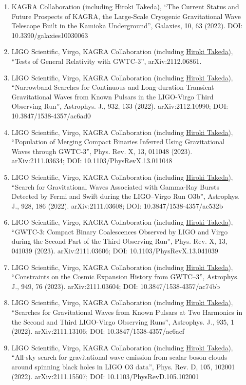 \documentclass[uplatex, 11pt]{jsarticle}
\begin{document}
\begin{enumerate}
\item KAGRA Collaboration (including \uline{Hiroki Takeda}), “The Current Status and Future Prospects of KAGRA, the Large-Scale Cryogenic Gravitational Wave Telescope Built in the Kamioka Underground”, Galaxies, 10, 63 (2022). DOI: 10.3390/galaxies10030063
\item LIGO Scientific, Virgo, KAGRA Collaboration (including \uline{Hiroki Takeda}), “Tests of General Relativity with GWTC-3”, arXiv:2112.06861.
\item LIGO Scientific, Virgo, KAGRA Collaboration (including \uline{Hiroki Takeda}), “Narrowband Searches for Continuous and Long-duration Transient Gravitational Waves from Known Pulsars in the LIGO-Virgo Third Observing Run”, Astrophys. J., 932, 133 (2022). arXiv:2112.10990; DOI: 10.3847/1538-4357/ac6ad0
\item LIGO Scientific, Virgo, KAGRA Collaboration (including \uline{Hiroki Takeda}), “Population of Merging Compact Binaries Inferred Using Gravitational Waves through GWTC-3”, Phys. Rev. X, 13, 011048 (2023). arXiv:2111.03634; DOI: 10.1103/PhysRevX.13.011048
\item LIGO Scientific, Virgo, KAGRA Collaboration (including \uline{Hiroki Takeda}), “Search for Gravitational Waves Associated with Gamma-Ray Bursts Detected by Fermi and Swift during the LIGO--Virgo Run O3b”, Astrophys. J., 928, 186 (2022). arXiv:2111.03608; DOI: 10.3847/1538-4357/ac532b
\item LIGO Scientific, Virgo, KAGRA Collaboration (including \uline{Hiroki Takeda}), “GWTC-3: Compact Binary Coalescences Observed by LIGO and Virgo during the Second Part of the Third Observing Run”, Phys. Rev. X, 13, 041039 (2023). arXiv:2111.03606; DOI: 10.1103/PhysRevX.13.041039
\item LIGO Scientific, Virgo, KAGRA Collaboration (including \uline{Hiroki Takeda}), “Constraints on the Cosmic Expansion History from GWTC--3”, Astrophys. J., 949, 76 (2023). arXiv:2111.03604; DOI: 10.3847/1538-4357/ac74bb
\item LIGO Scientific, Virgo, KAGRA Collaboration (including \uline{Hiroki Takeda}), “Searches for Gravitational Waves from Known Pulsars at Two Harmonics in the Second and Third LIGO-Virgo Observing Runs”, Astrophys. J., 935, 1 (2022). arXiv:2111.13106; DOI: 10.3847/1538-4357/ac6acf
\item LIGO Scientific, Virgo, KAGRA Collaboration (including \uline{Hiroki Takeda}), “All-sky search for gravitational wave emission from scalar boson clouds around spinning black holes in LIGO O3 data”, Phys. Rev. D, 105, 102001 (2022). arXiv:2111.15507; DOI: 10.1103/PhysRevD.105.102001

\end{enumerate}
\end{document}
